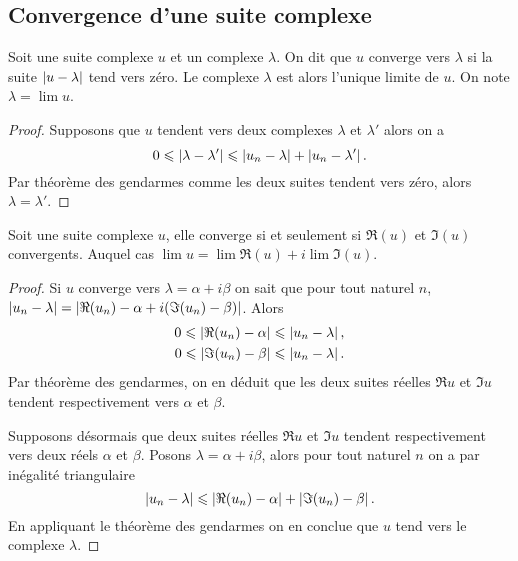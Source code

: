 \subsection{Convergence d'une suite complexe}

\begin{defdef}
  Soit une suite complexe \(u\) et un complexe \(\lambda\). On dit que \(u\) converge vers \(\lambda\) si la suite \(\left\lvert u-\lambda\right\rvert\) tend vers zéro. Le complexe \(\lambda\) est alors l'unique limite de \(u\). On note \(\lambda = \lim u\).
\end{defdef}
\begin{proof}
  Supposons que \(u\) tendent vers deux complexes \(\lambda\) et \(\lambda'\) alors on a
  \begin{equation}
    0 \leqslant \left\lvert\lambda - \lambda'\right\rvert \leqslant \left\lvert u_n-\lambda\right\rvert + \left\lvert u_n-\lambda'\right\rvert.
  \end{equation}
Par théorème des gendarmes comme les deux suites tendent vers zéro, alors \(\lambda=\lambda'\).
\end{proof}

\begin{prop}
  Soit une suite complexe \(u\), elle converge si et seulement si \(\Re(u)\) et \(\Im(u)\) convergents. Auquel cas \(\lim u = \lim \Re(u) + i \lim \Im(u)\).
\end{prop}
\begin{proof}
  Si \(u\) converge vers \(\lambda=\alpha+ i \beta\) on sait que pour tout naturel \(n\), \(\left\lvert u_n-\lambda\right\rvert=\left\lvert\Re(u_n)-\alpha + i(\Im(u_n)-\beta)\right\rvert\). Alors
  \begin{align}
    0 \leqslant \left\lvert\Re(u_n) -\alpha\right\rvert \leqslant \left\lvert u_n-\lambda\right\rvert, \\ 
    0 \leqslant \left\lvert\Im(u_n) -\beta\right\rvert \leqslant \left\lvert u_n-\lambda\right\rvert.
  \end{align}
  Par théorème des gendarmes, on en déduit que les deux suites réelles \(\Re u\) et \(\Im u\) tendent respectivement vers \(\alpha\) et \(\beta\).

  Supposons désormais que deux suites réelles \(\Re u\) et \(\Im u\) tendent respectivement vers deux réels \(\alpha\) et \(\beta\). Posons \(\lambda = \alpha + i \beta\), alors pour tout naturel \(n\) on a par inégalité triangulaire
\begin{equation}
  \left\lvert u_n-\lambda\right\rvert \leqslant \left\lvert\Re(u_n) - \alpha\right\rvert + \left\lvert\Im(u_n) - \beta\right\rvert.
\end{equation}
En appliquant le théorème des gendarmes on en conclue que \(u\) tend vers le complexe \(\lambda\).
\end{proof}

